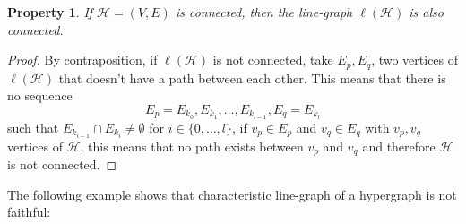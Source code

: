 \documentclass[a4paper,11pt]{report}
\newtheorem{property}[theorem]{Property}
\newcommand{\hgrafeen}{\mathcal{H}}
\begin{document}
\begin{property}\label{linegrafconnected}
If $\hgrafeen = (V, E)$ is connected, then the line-graph $\ell(\hgrafeen)$ is 
also connected.
\end{property}
\begin{proof}
By contraposition, if $\ell(\hgrafeen)$ is not connected, take $E_p, E_q$,  two vertices of $\ell(\hgrafeen)$ 
 that doesn't have a path between each other. This means that there is no 
 sequence
 $$E_p = E_{k_0}, E_{k_1}, \ldots, E_{k_{l-1}}, E_q = E_{k_l}$$
such that $E_{k_{i-1}} \cap E_{k_i} \not = \emptyset$ for $i \in \{0,\ldots, l\}$, if $v_p \in E_p$ and $v_q \in E_q$ 
 with $v_p,v_q$ vertices of $\hgrafeen$, this means that no path exists between $v_p$ 
 and $v_q$ and therefore $\hgrafeen$ is not connected.
 \end{proof}



The following example shows that characteristic line-graph of a hypergraph is 
not faithful:
\end{document}
